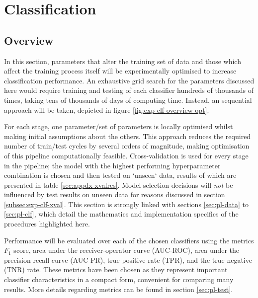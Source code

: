 \section{Classification}
\label{sec:exp-clf}
    \subsection{Overview}
    \label{subsec:exp-clf-overview}
        
        In this section, parameters that alter the training set of data and those which affect the training process itself will be experimentally optimised to increase classification performance. An exhaustive grid search for the parameters discussed here would require training and testing of each classifier hundreds of thousands of times, taking tens of thousands of days of computing time. Instead, an sequential approach will be taken, depicted in figure \ref{fig:exp-clf-overview-opt}. 
    
        For each stage, one parameter/set of parameters is locally optimised whilst making initial assumptions about the others. This approach reduces the required number of train/test cycles by several orders of magnitude, making optimisation of this pipeline computationally feasible. Cross-validation is used for every stage in the pipeline; the model with the highest performing hyperparameter combination is chosen and then tested on `unseen` data, results of which are presented in table \ref{sec:appdx-xvalres}. Model selection decisions will \textit{not} be influenced by test results on unseen data for reasons discussed in section \ref{subsec:exp-clf-xval}. This section is strongly linked with sections \ref{sec:pl-data} to \ref{sec:pl-clf}, which detail the mathematics and implementation specifics of the procedures highlighted here.
        
        Performance will be evaluated over each of the chosen classifiers using the metrics $F_{1}$ score, area under the receiver-operator curve (AUC-ROC), area under the precision-recall curve (AUC-PR), true positive rate (TPR), and the true negative (TNR) rate. These metrics have been chosen as they represent important classifier characteristics in a compact form, convenient for comparing many results. More details regarding metrics can be found in section \ref{sec:pl-test}. 

      
